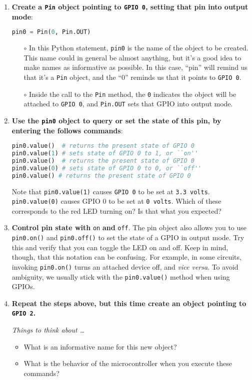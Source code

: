 \begin{enumerate}
	\item \textbf{Create a \texttt{Pin} object pointing to \texttt{GPIO 0}, setting that pin into output mode}:
\begin{lstlisting}[language=Python]
pin0 = Pin(0, Pin.OUT) 
\end{lstlisting}	
	
	\begin{itemize}
		\item[$\circ$] In this Python statement, \texttt{pin0} is the name of the object to be created. 
		This name could in general be almost anything, but it's a good idea to make names as informative as possible. 
		In this case, ``pin'' will remind us that it's a \texttt{Pin} object, and the ``0'' reminds us that it points to \texttt{GPIO 0}.
	
	
	\item[$\circ$] Inside the call to the \texttt{Pin} method, the \texttt{0} indicates the object will be attached to \texttt{GPIO 0}, and \texttt{Pin.OUT} sets that GPIO into output mode.
	\end{itemize}
 
	\item \textbf{Use the \texttt{pin0} object to query or set the state of this pin, by entering the follows commands}:
\begin{lstlisting}[language=Python]
pin0.value()  # returns the present state of GPIO 0
pin0.value(1) # sets state of GPIO 0 to 1, or ``on''
pin0.value()  # returns the present state of GPIO 0
pin0.value(0) # sets state of GPIO 0 to 0, or ``off''
pin0.value() # returns the present state of GPIO 0
\end{lstlisting}
	Note that \texttt{pin0.value(1)} causes \texttt{GPIO 0} to be set at \texttt{3.3 volts}.
	\texttt{pin0.value(0)} causes GPIO 0 to be set at \texttt{0 volts}.
	Which of these corresponds to the red LED turning on? Is that what you expected? 
	
	\item \textbf{Control pin state with } \lstinline{on} \textbf{and} \lstinline{off}.
	The pin object also allows you to use \lstinline{pin0.on()} and \lstinline{pin0.off()} to set the state of a GPIO in output mode. 
	Try this and verify that you can toggle the LED on and off.
	Keep in mind, though, that this notation can be confusing. 
	For example, in some circuits, invoking \lstinline{pin0.on()} turns an attached device  off, and \textit{vice versa}. 
	To avoid ambiguity, we usually stick with the \lstinline{pin0.value()} method when using GPIOs.
	
	\item \textbf{Repeat the steps above, but this time create an object pointing to \texttt{GPIO 2}.}
	
	\emph{Things to think about \dots}
	\begin{itemize}
		\item What is an informative name for this new object? 
		\item What is the behavior of the microcontroller when you execute these commands?
	\end{itemize}
\end{enumerate}

